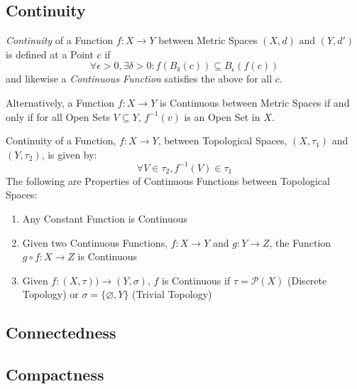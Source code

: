 \documentclass{article}
\begin{document}
\subsection{Continuity}\label{subsec:topological_continuity}

\emph{Continuity} of a Function $f : X \rightarrow Y$ between Metric
Spaces $(X,d)$ and $(Y,d')$ is defined at a Point $c$
if
\[
    \forall \epsilon > 0, \exists \delta > 0 :
    f (B_{\delta}(c)) \subseteq B_{\epsilon}(f(c))
\]
and likewise a \emph{Continuous Function} satisfies the above for all
$c$.

Alternatively, a Function $f: X \rightarrow Y$ is Continuous between
Metric Spaces if and only if for all Open Sets $V \subseteq Y$,
$f^{-1}(v)$ is an Open Set in $X$.

Continuity of a Function, $f : X \rightarrow Y$, between Topological
Spaces, $(X,\tau_1)$ and $(Y,\tau_2)$, is given by:
\[
    \forall V \in \tau_2, f^{-1}(V) \in \tau_1
\]
The following are Properties of Continuous Functions between
Topological Spaces:
\begin{enumerate}
    \item Any Constant Function is Continuous
    \item Given two Continuous Functions, $f : X \rightarrow Y$ and $g
      : Y \rightarrow Z$, the Function $g \circ f : X \rightarrow Z$ is
      Continuous
    \item Given $f : (X, \tau)) \rightarrow (Y, \sigma)$, $f$ is
      Continuous if $\tau = \mathcal{P}(X)$ (Discrete Topology) or
      $\sigma = \{\varnothing, Y\}$ (Trivial Topology)
\end{enumerate}



\subsection{Connectedness}\label{subsec:connectedness}

\subsection{Compactness}\label{subsec:compactness}
\end{document}
